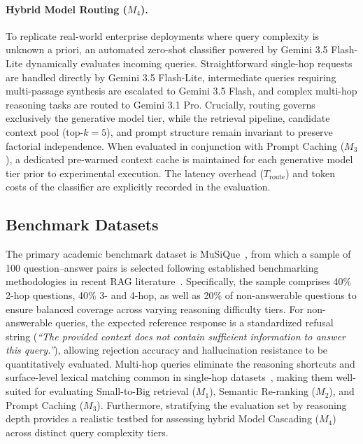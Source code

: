 \paragraph{Hybrid Model Routing ($M_4$).}
To replicate real-world enterprise deployments where query complexity is unknown a priori, an automated zero-shot classifier powered by Gemini 3.5 Flash-Lite dynamically evaluates incoming queries. Straightforward single-hop requests are handled directly by Gemini 3.5 Flash-Lite, intermediate queries requiring multi-passage synthesis are escalated to Gemini 3.5 Flash, and complex multi-hop reasoning tasks are routed to Gemini 3.1 Pro. Crucially, routing governs exclusively the generative model tier, while the retrieval pipeline, candidate context pool ($\text{top-}k = 5$), and prompt structure remain invariant to preserve factorial independence. When evaluated in conjunction with Prompt Caching ($M_3$), a dedicated pre-warmed context cache is maintained for each generative model tier prior to experimental execution. The latency overhead ($T_{\text{route}}$) and token costs of the classifier are explicitly recorded in the evaluation.

\subsection{Benchmark Datasets}
\label{subsec:bench_datasets}

The primary academic benchmark dataset is MuSiQue~\citep{trivedi2022musique}, from which a sample of 100 question--answer pairs is selected following established benchmarking methodologies in recent RAG literature~\citep{lumer2025rethinking, demourajunior2026adaptive}. Specifically, the sample comprises 40\% 2-hop questions, 40\% 3- and 4-hop, as well as 20\% of non-answerable questions to ensure balanced coverage across varying reasoning difficulty tiers. For non-answerable queries, the expected reference response is a standardized refusal string (\textit{``The provided context does not contain sufficient information to answer this query.''}), allowing rejection accuracy and hallucination resistance to be quantitatively evaluated. Multi-hop queries eliminate the reasoning shortcuts and surface-level lexical matching common in single-hop datasets~\citep{trivedi2022musique}, making them well-suited for evaluating Small-to-Big retrieval ($M_1$), Semantic Re-ranking ($M_2$), and Prompt Caching ($M_3$). Furthermore, stratifying the evaluation set by reasoning depth provides a realistic testbed for assessing hybrid Model Cascading ($M_4$) across distinct query complexity tiers. 

